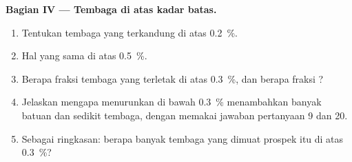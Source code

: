 \begin{problem}
\noindent\textbf{Bagian IV --- Tembaga di atas kadar batas.}
\begin{enumerate}[resume]
  \item Tentukan tembaga yang terkandung di atas  \qty{0.2}{\percent}.
  \item Hal yang sama di atas \qty{0.5}{\percent}.
  \item Berapa fraksi tembaga yang terletak di atas \qty{0.3}{\percent}, dan berapa fraksi
        ?
  \item Jelaskan mengapa menurunkan  di bawah \qty{0.3}{\percent} menambahkan banyak batuan dan sedikit
        tembaga, dengan memakai jawaban pertanyaan 9 dan 20.
  \item Sebagai ringkasan: berapa banyak tembaga yang dimuat prospek itu di atas  \qty{0.3}{\percent}?
\end{enumerate}
\end{problem}
